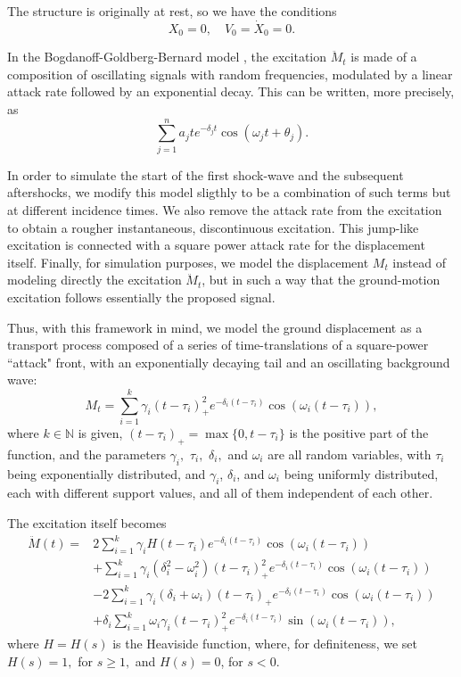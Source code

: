 \documentclass[reqno,12pt]{amsart}
\theoremstyle{plain} %
\theoremstyle{definition} %
\begin{document}
The structure is originally at rest, so we have the conditions
\[
    X_0 = 0, \quad V_0 = \dot X_0 = 0.
\]

In the Bogdanoff-Goldberg-Bernard model \cite{BogdanoffGoldbergBernard1961}, 
the excitation $\ddot M_t$ is made of a composition of oscillating signals with random frequencies, modulated by a linear attack rate followed by an exponential decay. This can be written, more precisely, as
\[
    \sum_{j=1}^n a_j t e^{-\delta_j t}\cos(\omega_j t + \theta_j).
\]

In order to simulate the start of the first shock-wave and the subsequent aftershocks, we modify this model sligthly to be a combination of such terms but at different incidence times. We also remove the attack rate from the excitation to obtain a rougher instantaneous, discontinuous excitation. This jump-like excitation is connected with a square power attack rate for the displacement itself. Finally, for simulation purposes, we model the displacement $M_t$ instead of modeling directly the excitation $\ddot M_t$, but in such a way that the ground-motion excitation follows essentially the proposed signal.

Thus, with this framework in mind, we model the ground displacement as a transport process composed of a series of time-translations of a square-power ``attack" front, with an exponentially decaying tail and an oscillating background wave:
\begin{equation}
    M_t = \sum_{i=1}^k \gamma_i (t - \tau_i)_+^2 e^{-\delta_i (t - \tau_i)}\cos(\omega_i (t - \tau_i)),
\end{equation}
where $k\in \mathbb{N}$ is given, $(t-\tau_i)_+ = \max\{0, t - \tau_i\}$ is the positive part of the function, and the parameters $\gamma_i,$ $\tau_i,$ $\delta_i,$ and $\omega_i$ are all random variables, with $\tau_i$ being exponentially distributed, and $\gamma_i$, $\delta_i$, and $\omega_i$ being uniformly distributed, each with different support values, and all of them independent of each other.

The excitation itself becomes
\begin{align*}
    \ddot M(t) = & 2\sum_{i=1}^k\gamma_i H(t - \tau_i) e^{-\delta_i (t - \tau_i)}\cos(\omega_i (t - \tau_i)) \\
        & + \sum_{i=1}^k\gamma_i (\delta_i^2 - \omega_i^2)(t - \tau_i)_+^2 e^{-\delta_i (t - \tau_i)}\cos(\omega_i (t - \tau_i)) \\
        & -2\sum_{i=1}^k\gamma_i (\delta_i + \omega_i) (t - \tau_i)_+ e^{-\delta_i (t - \tau_i)}\cos(\omega_i (t - \tau_i)) \\
        & +\delta_i\sum_{i=1}^k\omega_i\gamma_i (t - \tau_i)_+^2 e^{-\delta_i (t - \tau_i)}\sin(\omega_i (t - \tau_i)),
\end{align*}
where $H = H(s)$ is the Heaviside function, where, for definiteness, we set $H(s) = 1,$ for $s \geq 1,$ and $H(s) = 0$, for $s < 0$.
\end{document}
